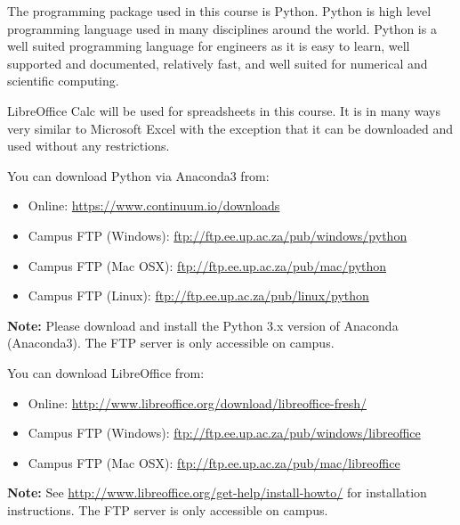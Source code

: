         The programming package used in this course is Python. Python is
        high level programming language used in many disciplines around the
        world. Python is a well suited programming language for engineers as
        it is easy to learn, well supported and documented, relatively fast,
        and well suited for numerical and scientific computing.

        LibreOffice Calc will be used for spreadsheets in this course. It is
        in many ways very similar to Microsoft Excel with the exception
        that it can be downloaded and used without any restrictions.

        \noindent
        You can download Python via Anaconda3 from:
        \begin{itemize}
            \item Online: \url{https://www.continuum.io/downloads}
            \item Campus FTP (Windows): \url{ftp://ftp.ee.up.ac.za/pub/windows/python}
            \item Campus FTP (Mac OSX): \url{ftp://ftp.ee.up.ac.za/pub/mac/python}
            \item Campus FTP (Linux): \url{ftp://ftp.ee.up.ac.za/pub/linux/python}
        \end{itemize}
        \textbf{Note:} Please download and install the Python 3.x version of
        Anaconda (Anaconda3). The FTP server is only accessible on campus.

        \noindent
        You can download LibreOffice from:
        \begin{itemize}
            \item Online: \url{http://www.libreoffice.org/download/libreoffice-fresh/}
            \item Campus FTP (Windows): \url{ftp://ftp.ee.up.ac.za/pub/windows/libreoffice}
            \item Campus FTP (Mac OSX): \url{ftp://ftp.ee.up.ac.za/pub/mac/libreoffice}
        \end{itemize}
        \textbf{Note:} See
        \url{http://www.libreoffice.org/get-help/install-howto/} for
        installation instructions. The FTP server is only accessible on campus.
